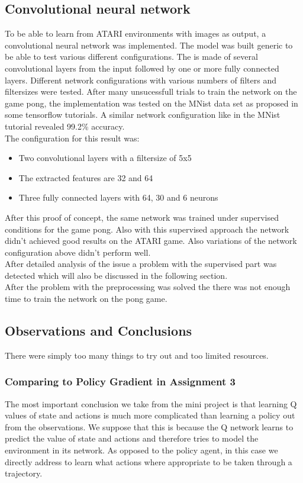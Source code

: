 \documentclass[10pt,a4paper]{article}
\begin{document}
\subsection{Convolutional neural network}
To be able to learn from ATARI environments with images as output, a convolutional neural network was implemented. The model was built generic to be able to test various different configurations. The is made of several convolutional layers from the input followed by one or more fully connected layers. Different network configurations with various numbers of filters and filtersizes were tested.
After many unsucessfull trials to train the network on the game pong, the implementation was tested on the MNist data set as proposed in some tensorflow tutorials. A similar network configuration like in the MNist tutorial revealed 99.2\% accuracy.\\

\noindent The configuration for this result was:
\begin{itemize}
\item Two convolutional layers with a filtersize of 5x5
\item The extracted features are 32 and 64
\item Three fully connected layers with 64, 30 and 6 neurons
\end{itemize} 

\noindent After this proof of concept, the same network was trained under supervised conditions for the game pong. Also with this supervised approach the network didn't achieved good results on the ATARI game. Also variations of the network configuration above didn't perform well.\\
After detailed analysis of the issue a problem with the supervised part was detected which will also be discussed in the following section.\\
After the problem with the preprocessing was solved the there was not enough time to train the network on the pong game.

\subsection{Observations and Conclusions}
There were simply too many things to try out and too limited resources.

\subsubsection{Comparing to Policy Gradient in Assignment 3}
The most important conclusion we take from the mini project is that learning Q values of state and actions is much more complicated than learning a policy out from the observations. We suppose that this is because the Q network learns to predict the value of state and actions and therefore tries to model the environment in its network. As opposed to the policy agent, in this case we directly address to learn what actions where appropriate to be taken through a trajectory.
\end{document}

